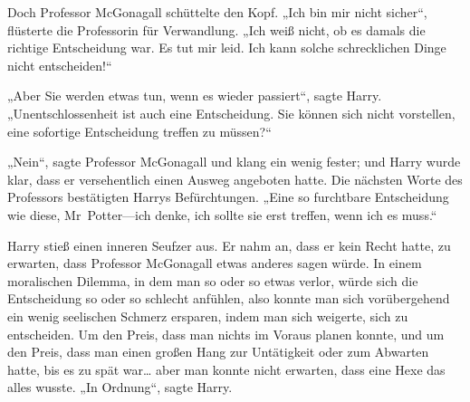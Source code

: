 Doch Professor McGonagall schüttelte den Kopf. „Ich bin mir nicht sicher“, flüsterte die Professorin für Verwandlung. „Ich weiß nicht, ob es damals die richtige Entscheidung war. Es tut mir leid. Ich kann solche schrecklichen Dinge nicht entscheiden!“

„Aber Sie werden etwas tun, wenn es wieder passiert“, sagte Harry. „Unentschlossenheit ist auch eine Entscheidung. Sie können sich nicht vorstellen, eine sofortige Entscheidung treffen zu müssen?“

„Nein“, sagte Professor McGonagall und klang ein wenig fester; und Harry wurde klar, dass er versehentlich einen Ausweg angeboten hatte. Die nächsten Worte des Professors bestätigten Harrys Befürchtungen. „Eine so furchtbare Entscheidung wie diese, Mr~Potter—ich denke, ich sollte sie erst treffen, wenn ich es muss.“

Harry stieß einen inneren Seufzer aus. Er nahm an, dass er kein Recht hatte, zu erwarten, dass Professor McGonagall etwas anderes sagen würde. In einem moralischen Dilemma, in dem man so oder so etwas verlor, würde sich die Entscheidung so oder so schlecht anfühlen, also konnte man sich vorübergehend ein wenig seelischen Schmerz ersparen, indem man sich weigerte, sich zu entscheiden. Um den Preis, dass man nichts im Voraus planen konnte, und um den Preis, dass man einen großen Hang zur Untätigkeit oder zum Abwarten hatte, bis es zu spät war… aber man konnte nicht erwarten, dass eine Hexe das alles wusste.
„In Ordnung“, sagte Harry.

